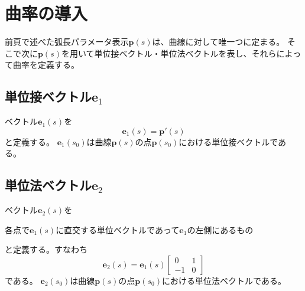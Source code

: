 \documentclass[a4j,disablejfam,dvipdfmx,papersize,slide,uplatex,21pt]{jsarticle}
\begin{document}
\section{曲率の導入}
前頁で述べた弧長パラメータ表示$\bm{p}(s)$は、曲線に対して唯一つに定まる。
そこで次に$\bm{p}(s)$を用いて単位接ベクトル・単位法ベクトルを表し、それらによって曲率を定義する。

\newpage
\subsection*{単位接ベクトル$\bm{e}_1$}
ベクトル$\bm{e}_1(s)$を
\begin{equation}
    \bm{e}_1(s) = \bm{p}'(s)
\end{equation}
と定義する。
$\bm{e}_1(s_0)$は曲線$\bm{p}(s)$の点$\bm{p}(s_0)$における単位接ベクトルである。

\newpage
\subsection*{単位法ベクトル$\bm{e}_2$}
ベクトル$\bm{e}_2(s)$を
\begin{center}
    各点で$\bm{e}_1(s)$に直交する単位ベクトルであって$\bm{e}_1$の左側にあるもの
\end{center}
と定義する。すなわち
\begin{equation}
    \bm{e}_2(s) = \bm{e}_1(s)
    \left[
    \begin{array}{cc}
        0 & 1 \\
        -1 & 0
    \end{array}
    \right]
\end{equation}
である。
$\bm{e}_2(s_0)$は曲線$\bm{p}(s)$の点$\bm{p}(s_0)$における単位法ベクトルである。

\newpage
\end{document}
